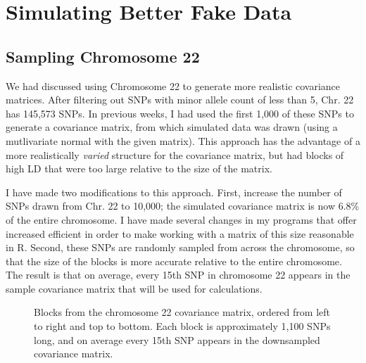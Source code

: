 \documentclass[12pt]{article}
\begin{document}
\maketitle



\section{Simulating Better Fake Data}

\subsection{Sampling Chromosome 22}

We had discussed using Chromosome 22 to generate more realistic covariance matrices. After filtering out SNPs with minor allele count of less than 5, Chr. 22 has 145,573 SNPs. In previous weeks, I had used the first 1,000 of these SNPs to generate a covariance matrix, from which simulated data was drawn (using a mutlivariate normal with the given matrix). This approach has the advantage of a more realistically \emph{varied} structure for the covariance matrix, but had blocks of high LD that were too large relative to the size of the matrix.

I have made two modifications to this approach. First, increase the number of SNPs drawn from Chr. 22 to 10,000; the simulated covariance matrix is now 6.8\% of the entire chromosome. I have made several changes in my programs that offer increased efficient in order to make working with a matrix of this size reasonable in R. Second, these SNPs are randomly sampled from across the chromosome, so that the size of the blocks is more accurate relative to the entire chromosome. The result is that on average, every 15th SNP in chromosome 22 appears in the sample covariance matrix that will be used for calculations.

\begin{figure}
\centering
\hspace{0in}
\hspace{0in}
\caption{Blocks from the chromosome 22 covariance matrix, ordered from left to right and top to bottom. Each block is approximately 1,100 SNPs long, and on average every 15th SNP appears in the downsampled covariance matrix.}
\label{matheat}
\end{figure}
\end{document}
